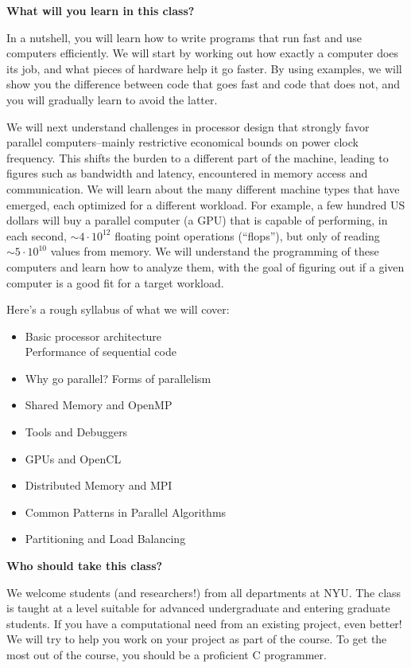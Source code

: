 {\sffamily\large\bfseries What will you learn in this class?}

In a nutshell, you will learn how to write programs that run fast and
use computers efficiently. We will start by working out how exactly a
computer does its job, and what pieces of hardware help it go faster.
By using examples, we will show you the difference between code that
goes fast and code that does not, and you will gradually learn to avoid
the latter.

We will next understand challenges in processor design that strongly
favor parallel computers--mainly restrictive economical bounds on
power clock frequency. This shifts the burden to a different part of
the machine, leading to figures such as bandwidth and latency,
encountered in memory access and communication. We will learn about
the many different machine types that have emerged, each optimized for
a different workload.  For example, a few hundred US dollars will buy
a parallel computer (a GPU) that is capable of performing, in each
second, $\sim 4\cdot 10^{12}$ floating point operations (``flops''),
but only of reading $\sim 5\cdot 10^{10}$ values from memory. We will
understand the programming of these computers and learn how to analyze
them, with the goal of figuring out if a given computer is a good fit
for a target workload.

Here's a rough syllabus of what we will cover:
\vspace{-1em}
\begin{itemize}
\setlength{\itemsep}{-1mm}
  \item Basic processor architecture\\
    Performance of sequential code
  \item Why go parallel? Forms of parallelism
  \item Shared Memory and OpenMP
  \item Tools and Debuggers
  \item GPUs and OpenCL
  \item Distributed Memory and MPI
  \item Common Patterns in Parallel Algorithms
  \item Partitioning and Load Balancing
\end{itemize}


{\sffamily\large\bfseries Who should take this class?}

We welcome students (and researchers!) from all departments at NYU.
The class is taught at a level suitable for advanced undergraduate and
entering graduate students. If you have a computational need from an
existing project, even better! We will try to help you work on your
project as part of the course.
To get the most out of the course, you should be a proficient C
programmer.

